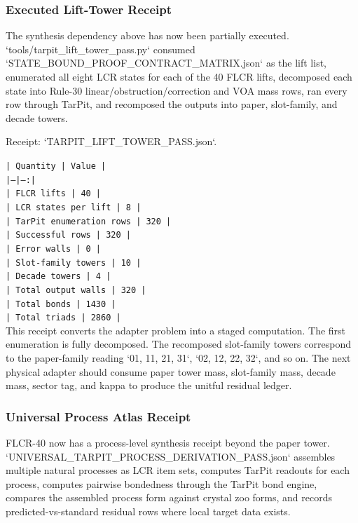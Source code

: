 \documentclass[11pt]{article}
\begin{document}
\subsubsection*{Executed Lift-Tower Receipt}

The synthesis dependency above has now been partially executed. `tools/tarpit\_lift\_tower\_pass.py` consumed `STATE\_BOUND\_PROOF\_CONTRACT\_MATRIX.json` as the lift list, enumerated all eight LCR states for each of the 40 FLCR lifts, decomposed each state into Rule-30 linear/obstruction/correction and VOA mass rows, ran every row through TarPit, and recomposed the outputs into paper, slot-family, and decade towers.

Receipt: `TARPIT\_LIFT\_TOWER\_PASS.json`.

\noindent\texttt{| Quantity | Value |}\\
\noindent\texttt{|---|---:|}\\
\noindent\texttt{| FLCR lifts | 40 |}\\
\noindent\texttt{| LCR states per lift | 8 |}\\
\noindent\texttt{| TarPit enumeration rows | 320 |}\\
\noindent\texttt{| Successful rows | 320 |}\\
\noindent\texttt{| Error walls | 0 |}\\
\noindent\texttt{| Slot-family towers | 10 |}\\
\noindent\texttt{| Decade towers | 4 |}\\
\noindent\texttt{| Total output walls | 320 |}\\
\noindent\texttt{| Total bonds | 1430 |}\\
\noindent\texttt{| Total triads | 2860 |}\\

This receipt converts the adapter problem into a staged computation. The first enumeration is fully decomposed. The recomposed slot-family towers correspond to the paper-family reading `01, 11, 21, 31`, `02, 12, 22, 32`, and so on. The next physical adapter should consume paper tower mass, slot-family mass, decade mass, sector tag, and kappa to produce the unitful residual ledger.

\subsubsection*{Universal Process Atlas Receipt}

FLCR-40 now has a process-level synthesis receipt beyond the paper tower. `UNIVERSAL\_TARPIT\_PROCESS\_DERIVATION\_PASS.json` assembles multiple natural processes as LCR item sets, computes TarPit readouts for each process, computes pairwise bondedness through the TarPit bond engine, compares the assembled process form against crystal zoo forms, and records predicted-vs-standard residual rows where local target data exists.
\end{document}
